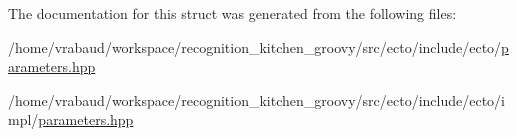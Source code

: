 \-The documentation for this struct was generated from the following files\-:\begin{DoxyCompactItemize}
\item 
/home/vrabaud/workspace/recognition\-\_\-kitchen\-\_\-groovy/src/ecto/include/ecto/\hyperlink{parameters_8hpp}{parameters.\-hpp}\item 
/home/vrabaud/workspace/recognition\-\_\-kitchen\-\_\-groovy/src/ecto/include/ecto/impl/\hyperlink{impl_2parameters_8hpp}{parameters.\-hpp}\end{DoxyCompactItemize}
